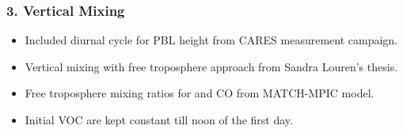 \begin{frame}
    \frametitle{3. Vertical Mixing}

    \vspace{-5mm}
    \begin{itemize}
        \item Included diurnal cycle for PBL height from CARES measurement campaign. \vspace{3mm}
        \item Vertical mixing with free troposphere approach from Sandra Louren's thesis. \vspace{3mm}
        \item Free troposphere mixing ratios for  and CO from MATCH-MPIC model. \vspace{3mm}
        \item Initial VOC are kept constant till noon of the first day.
    \end{itemize}
\end{frame}

{
    \begin{frame}[plain]
    \end{frame}
}

%

